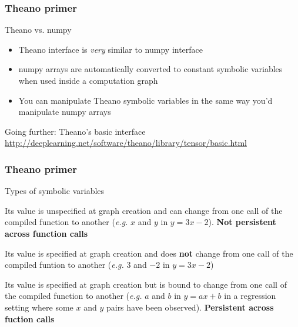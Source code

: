\documentclass[mathserif, xcolor=dvipsnames]{beamer}
\begin{document}
\begin{frame}
    \frametitle{Theano primer}
    \begin{block}{Theano vs. numpy}
    \begin{itemize}\addtolength{\itemsep}{1.0\baselineskip}
        \item{Theano interface is \emph{very} similar to numpy interface}
        \item{numpy arrays are automatically converted to constant symbolic
              variables when used inside a computation graph}
        \item{You can manipulate Theano symbolic variables in the same way you'd
              manipulate numpy arrays}
    \end{itemize}
    \end{block}


    \begin{alertblock}{Going further: Theano's basic interface}
        \url{http://deeplearning.net/software/theano/library/tensor/basic.html}
    \end{alertblock}
\end{frame}

\begin{frame}
    \frametitle{Theano primer}
    \begin{block}{Types of symbolic variables}
    \begin{description}\addtolength{\itemsep}{1.0\baselineskip}
        \item[TensorVariable]{Its value is unspecified at graph creation and
                              can change from one call of the compiled function
                              to another (\emph{e.g.} $x$ and $y$ in
                              $y = 3x - 2$). \textbf{Not persistent across
                              function calls}}
        \item[TensorConstant]{Its value is specified at graph creation and
                              does \textbf{not} change from one call of the
                              compiled funtion to another (\emph{e.g.} $3$ and
                              $-2$ in $y = 3x - 2$)}
        \item[TensorSharedVariable]{Its value is specified at graph creation
                                    but is bound to change from one call of the
                                    compiled function to another (\emph{e.g.}
                                    $a$ and $b$ in $y = ax + b$ in a regression
                                    setting where some $x$ and $y$ pairs have
                                    been observed). \textbf{Persistent across
                                    fuction calls}}
    \end{description}
    \end{block}
\end{frame}
\end{document}
